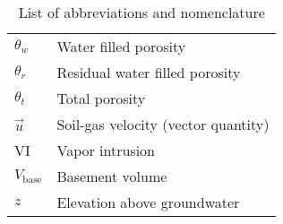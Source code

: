 \begin{table}[htb!]
\begin{tabular}{l l}
    $\theta_w$ & Water filled porosity \\
    $\theta_r$ & Residual water filled porosity \\
    $\theta_t$ & Total porosity \\
    $\vec{u}$ & Soil-gas velocity (vector quantity) \\
    VI & Vapor intrusion \\
    $V_\mathrm{base}$ & Basement volume \\
    $z$ & Elevation above groundwater \\
    \bottomrule
  \end{tabular}
  \caption{List of abbreviations and nomenclature}\label{tbl:abbreviations}
\end{table}
